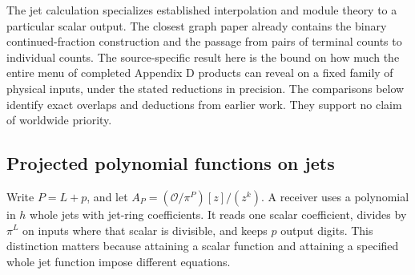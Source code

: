 \documentclass[11pt,a4paper]{article}
\begin{document}
The jet calculation specializes established interpolation and module
theory to a particular scalar output. The closest graph paper already
contains the binary continued-fraction construction and the passage from
pairs of terminal counts to individual counts. The source-specific
result here is the bound on how much the entire menu of completed
Appendix D products can reveal on a fixed family of physical inputs,
under the stated reductions in precision. The comparisons below identify
exact overlaps and deductions from earlier work. They support no claim
of worldwide priority.

\subsection{Projected polynomial functions on
jets}\label{v8-projected-polynomial-functions-on-jets}

Write \(P=L+p\), and let \(A_P=(\mathcal O/\pi^P)[z]/(z^k)\). A receiver
uses a polynomial in \(h\) whole jets with jet-ring coefficients. It
reads one scalar coefficient, divides by \(\pi^L\) on inputs where that
scalar is divisible, and keeps \(p\) output digits. This distinction
matters because attaining a scalar function and attaining a specified
whole jet function impose different equations.
\end{document}
